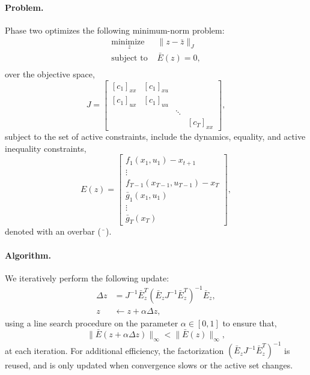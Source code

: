 \paragraph{Problem.} Phase two optimizes the following minimum-norm \cite{nocedal2006numerical} problem:
\begin{equation}
	\begin{array}{ll}
		\underset{z}{\mbox{minimize }}  & \| z - \bar{z} \|_J \\
		\mbox{subject to } & \bar{E}(z) = 0, \\
	\end{array} \label{altro_solution_polishing}
\end{equation}
over the objective space, 
\begin{equation}
	J = \begin{bmatrix} 
			[c_1]_{xx} & [c_1]_{xu} & & \\ 
			[c_1]_{ux} & [c_1]_{uu} & & \\ 
			& & \ddots & \\ & & & [c_T]_{xx} 
		\end{bmatrix},
\end{equation}
subject to the set of active constraints, include the dynamics, equality, and active inequality constraints,
\begin{equation}
	E(z) = \begin{bmatrix} 
			f_1(x_1, u_1) - x_{t+1} \\ 
			\vdots \\
			f_{T-1}(x_{T-1}, u_{T-1}) - x_{T} \\
			\bar{g}_1(x_1, u_1) \\
			\vdots \\
			\bar{g}_T(x_T)
		\end{bmatrix},
\end{equation} 
denoted with an overbar ($\bar{\phantom{x}}$). 

\paragraph{Algorithm.} 
We iteratively perform the following update: 
\begin{align}
	\Delta z &= J^{-1} \bar{E}_z^T (\bar{E}_{z} J^{-1} \bar{E}_{z}^T)^{-1} \bar{E}_{z}, \\
	z &\leftarrow z + \alpha \Delta z,
\end{align}
using a line search procedure on the parameter $\alpha \in [0, 1]$ to ensure that,
\begin{equation}
	\|\bar{E}(z + \alpha \Delta z)\|_{\infty} < \|\bar{E}(z)\|_{\infty},
\end{equation} 
at each iteration. For additional efficiency, the factorization $(\bar{E}_{z} J^{-1} \bar{E}_{z}^T)^{-1}$ is reused, and is only updated when convergence slows or the active set changes.


